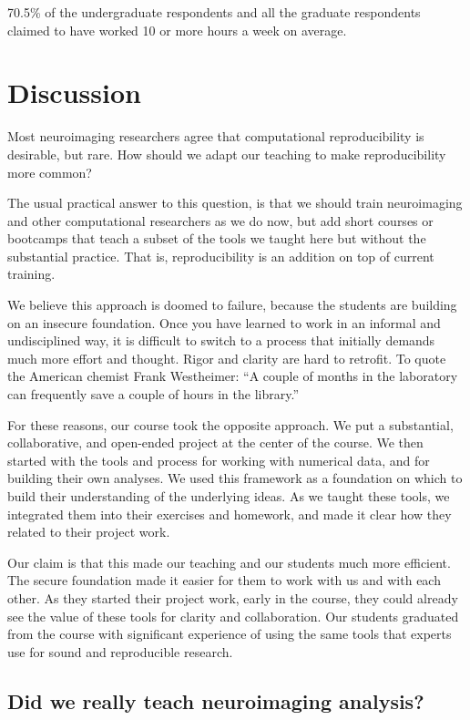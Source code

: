 70.5\% of the undergraduate respondents and all the graduate respondents
claimed to have worked 10 or more hours a week on average.

\section{Discussion}\label{discussion}

Most neuroimaging researchers agree that computational reproducibility is
desirable, but rare.  How should we adapt our teaching to make reproducibility
more common?

The usual practical answer to this question, is that we should train
neuroimaging and other computational researchers as we do now, but add short
courses or bootcamps that teach a subset of the tools we taught here but
without the substantial practice.  That is, reproducibility is an addition on
top of current training.

We believe this approach is doomed to failure, because the students are
building on an insecure foundation.  Once you have learned to work in an
informal and undisciplined way, it is difficult to switch to a process that
initially demands much more effort and thought.  Rigor and clarity are hard to
retrofit.
To quote the American chemist Frank Westheimer:
``A couple of months in the laboratory can frequently save a couple of hours
in the library.''

For these reasons, our course took the opposite approach.
We put a substantial, collaborative, and open-ended project at the center of
the course.
We then started with the tools and process for working with numerical data, and
for building their own analyses.
We used this framework as a foundation on which to build their understanding of
the underlying ideas.
As we taught these tools, we integrated them into their exercises and homework,
and made it clear how they related to their project work.

Our claim is that this made our teaching and our students much more efficient.
The secure foundation made it easier for them to work with us and with each
other. As they started their project work, early in the course, they could
already see the value of these tools for clarity and collaboration. Our
students graduated from the course with significant experience of using the
same tools that experts use for sound and reproducible research.

\subsection{Did we really teach neuroimaging analysis?}

